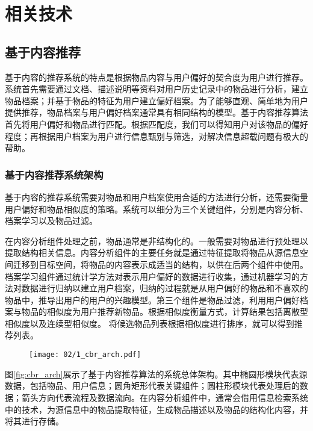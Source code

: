 
\chapter{相关技术}
\label{chap:related}

\section{基于内容推荐}

基于内容的推荐系统的特点是根据物品内容与用户偏好的契合度为用户进行推荐\cite{lops2011content}。系统首先需要通过文档、描述说明等资料对用户历史记录中的物品进行分析，建立物品档案；并基于物品的特征为用户建立偏好档案。为了能够直观、简单地为用户提供推荐，物品档案与用户偏好档案通常具有相同结构的模型。基于内容推荐算法首先将用户偏好和物品进行匹配。根据匹配度，我们可以得知用户对该物品的偏好程度；再根据用户档案为用户进行信息甄别与筛选，对解决信息超载问题有极大的帮助。

\subsection{基于内容推荐系统架构}
基于内容的推荐系统需要对物品和用户档案使用合适的方法进行分析，还需要衡量用户偏好和物品相似度的策略。系统可以细分为三个关键组件，分别是内容分析、档案学习以及物品过滤。

在内容分析组件处理之前，物品通常是非结构化的。一般需要对物品进行预处理以提取结构相关信息。内容分析组件的主要任务就是通过特征提取将物品从源信息空间迁移到目标空间，将物品的内容表示成适当的结构，以供在后两个组件中使用。档案学习组件通过统计学方法对表示用户偏好的数据进行收集，通过机器学习的方法对数据进行归纳以建立用户档案，归纳的过程就是从用户偏好的物品和不喜欢的物品中，推导出用户的用户的兴趣模型。第三个组件是物品过滤，利用用户偏好档案与物品的相似度\cite{herlocker2004evaluating}为用户推荐新物品。根据相似度衡量方式，计算结果包括离散型相似度以及连续型相似度。
将候选物品列表根据相似度进行排序，就可以得到推荐列表。

\begin{figure}
 \centering
 \texttt{[image: 02/1\_cbr\_arch.pdf]}
\end{figure}

图\ref{fig:cbr_arch}展示了基于内容推荐算法的系统总体架构。其中椭圆形模块代表源数据，包括物品、用户信息；圆角矩形代表关键组件；圆柱形模块代表处理后的数据；箭头方向代表流程及数据流向。在内容分析组件中，通常会借用信息检索系统中的技术，为源信息中的物品提取特征，生成物品描述以及物品的结构化内容，并将其进行存储。

